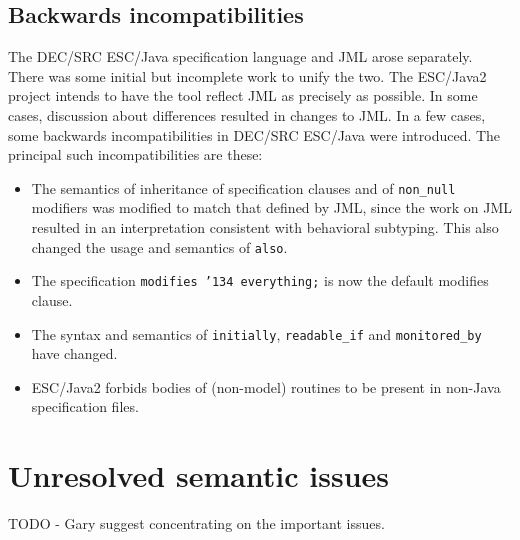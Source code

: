 \documentclass{sig-alternate}
\begin{document}
\subsection{Backwards incompatibilities}
The DEC/SRC ESC/Java specification language and JML arose separately.  There
was some initial but incomplete work to unify the two.  The ESC/Java2
project intends to have the tool reflect JML as precisely as possible.
In some cases, discussion about differences resulted in changes to JML.  In
a few cases, some backwards incompatibilities in DEC/SRC ESC/Java were
introduced.  The principal such incompatibilities are these:
\setlength{\partopsep}{0in}\setlength{\parskip}{0in}\setlength{\itemsep}{0in}\setlength{\topsep}{0in}
\begin{itemize}
\setlength{\partopsep}{0in}\setlength{\parskip}{0in}\setlength{\itemsep}{0in}\setlength{\topsep}{0in}
\item The semantics of inheritance of specification clauses and of
  \texttt{non\_null} modifiers was modified to match that defined by
  JML, since the work on JML resulted in an interpretation consistent
  with behavioral subtyping.  This also changed the usage and
  semantics of \texttt{also}.
\item The specification \texttt{modifies \char'134 everything;} is now the default
  modifies clause.
\item The syntax and semantics of \texttt{initially}, \texttt{readable\_if} 
 and \texttt{monitored\_by} have changed.
\item ESC/Java2 forbids bodies of (non-model) routines to be present
  in non-Java specification files.
\end{itemize}

\section{Unresolved semantic issues}
TODO - Gary suggest concentrating on the important issues.
\end{document}
